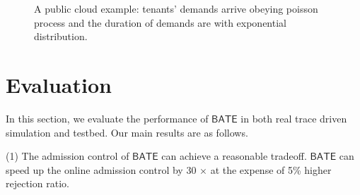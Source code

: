 \documentclass[sigconf]{acmart}
\begin{document}
\begin{figure}
\centering
{}
\caption{A public cloud example: tenants' demands arrive obeying poisson process and the duration of demands are with exponential distribution.}
\label{e2}
\end{figure}

\section{Evaluation} \label{evaluation}
In this section, we evaluate the performance of $\mathsf{BATE}$  in both real trace driven simulation and testbed.
Our main results are as follows.

(1)  The admission control of $\mathsf{BATE}$ can achieve a reasonable tradeoff. $\mathsf{BATE}$ can speed up the online admission control by 30 $\times$ at the expense of 5\% higher rejection ratio. 
\end{document}
